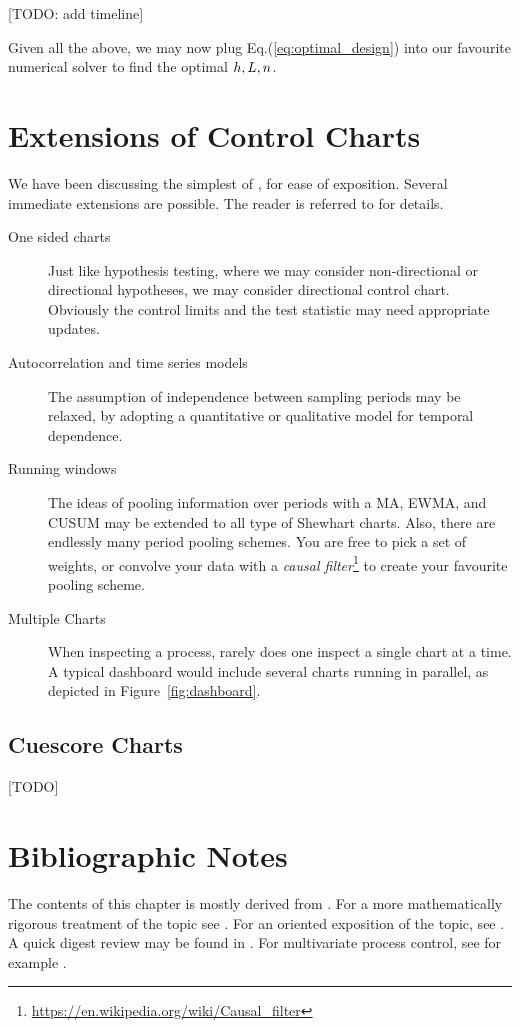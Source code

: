 [TODO: add timeline]

Given all the above, we may now plug Eq.(\ref{eq:optimal_design}) into our favourite numerical solver to find the optimal $h,L,n$.




\section[Extensions]{Extensions of Control Charts}
We have been discussing the simplest of \barxChart, for ease of exposition.
Several immediate extensions are possible.
The reader is referred to \cite{montgomery_introduction_2007} for details.
\begin{description}

\item [One sided charts] Just like hypothesis testing, where we may consider non-directional or directional hypotheses, we may consider directional control chart. 
Obviously the control limits and the test statistic may need appropriate updates.

\item [Autocorrelation and time series models] The assumption of independence between sampling periods may be relaxed, by adopting a quantitative or qualitative model for temporal dependence.

\item [Running windows] The ideas of pooling information over periods with a MA, EWMA, and CUSUM may be extended to all type of Shewhart charts. 
Also, there are endlessly many period pooling schemes. 
You are free to pick a set of weights, or convolve your data with a \emph{causal filter}\footnote{\url{https://en.wikipedia.org/wiki/Causal_filter}} to create your favourite pooling scheme.

\item [Multiple Charts] When inspecting a process, rarely does one inspect a single chart at a time. A typical dashboard would include several charts running in parallel, as depicted in Figure~\ref{fig:dashboard}.

\end{description}



\subsection{Cuescore Charts}
[TODO]



\section{Bibliographic Notes}
The contents of this chapter is mostly derived from \cite{montgomery_introduction_2007}. 
For a more mathematically rigorous treatment of the topic see \cite{basseville_detection_1993}.
For an \R oriented exposition of the topic, see \cite{qiu_introduction_2013}.
A quick digest review may be found in \cite{natrella_nist/sematech_2010}.
For multivariate process control, see for example \cite{ge_multivariate_2012}. 
